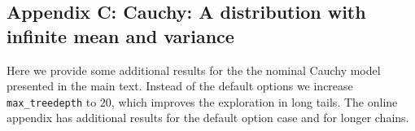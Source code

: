 \documentclass[american,]{article}
\let\oldparagraph\paragraph
\renewcommand{\paragraph}[1]{\oldparagraph{#1}\mbox{}}
\begin{document}
\hypertarget{AppendixE}{%
\subsection*{Appendix C: Cauchy: A distribution with infinite mean and
variance}\label{AppendixE}}

Here we provide some additional results for the the nominal Cauchy
model presented in the main text. Instead of the default options we
increase \texttt{max\_treedepth} to \(20\), which improves the
exploration in long tails. The online appendix has additional results
for the default option case and for longer chains.









\end{document}
